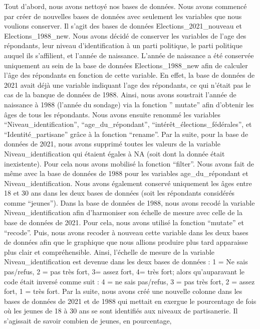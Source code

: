 \documentclass[
  letterpaper,
  DIV=11,
  numbers=noendperiod]{scrartcl}
\begin{document}
Tout d'abord, nous avons nettoyé nos bases de données. Nous avons
commencé par créer de nouvelles bases de données avec seulement les
variables que nous voulions conserver. Il s'agit des bases de données
Elections\_2021\_nouveau et Elections\_1988\_new. Nous avons décidé de
conserver les variables de l'age des répondants, leur niveau
d'identification à un parti politique, le parti politique auquel ils
s'affilient, et l'année de naissance. L'année de naissance a été
conservée uniquement au sein de la base de données Elections\_1988\_new
afin de calculer l'âge des répondants en fonction de cette variable. En
effet, la base de données de 2021 avait déjà une variable indiquant
l'age des répondants, ce qui n'était pas le cas de la banque de données
de 1988. Ainsi, nous avons soustrait l'année de naissance à 1988
(l'année du sondage) via la fonction '' mutate'' afin d'obtenir les âges
de tous les répondants. Nous avons ensuite renommé les variables
``Niveau\_identification'', ``age\_du\_répondant'',
``intérêt\_élections\_fédérales'', et ``Identité\_partisane'' grâce à la
fonction ``rename''. Par la suite, pour la base de données de 2021, nous
avons supprimé toutes les valeurs de la variable Niveau\_identification
qui étaient égales à NA (soit dont la donnée était inexistente). Pour
cela nous avons mobilisé la fonction ``filter''. Nous avons fait de même
avec la base de données de 1988 pour les variables age\_du\_répondant et
Niveau\_identification. Nous avons également conservé uniquement les
âges entre 18 et 30 ans dans les deux bases de données (soit les
répondants considérés comme ``jeunes''). Dans la base de données de
1988, nous avons recodé la variable Niveau\_identification afin
d'harmoniser son échelle de mesure avec celle de la base de données de
2021. Pour cela, nous avons utilisé la fonction ``mutate'' et
``recode''. Puis, nous avons recoder à nouveau cette variable dans les
deux bases de données afin que le graphique que nous allions produire
plus tard apparaisse plus clair et compréhensible. Ainsi, l'échelle de
mesure de la variable Niveau\_identification est devenue dans les deux
bases de données : 1 = Ne sais pas/refus, 2 = pas très fort, 3= assez
fort, 4= très fort; alors qu'auparavant le code était inversé comme suit
: 4 = ne sais pas/refus, 3 = pas très fort, 2 = assez fort, 1 = très
fort. Par la suite, nous avons créé une nouvelle colonne dans les bases
de données de 2021 et de 1988 qui mettait en exergue le pourcentage de
fois où les jeunes de 18 à 30 ans se sont identifiés aux niveaux de
partisanerie. Il s'agissait de savoir combien de jeunes, en pourcentage,
\end{document}
